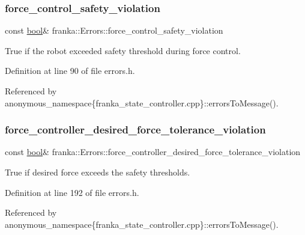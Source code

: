 \subsubsection{\texorpdfstring{force\+\_\+control\+\_\+safety\+\_\+violation}{force\_control\_safety\_violation}}
{\footnotesize\ttfamily const \hyperlink{classbool}{bool}\& franka\+::\+Errors\+::force\+\_\+control\+\_\+safety\+\_\+violation}

True if the robot exceeded safety threshold during force control. 

Definition at line 90 of file errors.\+h.



Referenced by anonymous\+\_\+namespace\{franka\+\_\+state\+\_\+controller.\+cpp\}\+::errors\+To\+Message().

\mbox{\label{structfranka_1_1Errors_ae474f20a64b2585dbe6496966dddff0a}} 
\subsubsection{\texorpdfstring{force\+\_\+controller\+\_\+desired\+\_\+force\+\_\+tolerance\+\_\+violation}{force\_controller\_desired\_force\_tolerance\_violation}}
{\footnotesize\ttfamily const \hyperlink{classbool}{bool}\& franka\+::\+Errors\+::force\+\_\+controller\+\_\+desired\+\_\+force\+\_\+tolerance\+\_\+violation}

True if desired force exceeds the safety thresholds. 

Definition at line 192 of file errors.\+h.



Referenced by anonymous\+\_\+namespace\{franka\+\_\+state\+\_\+controller.\+cpp\}\+::errors\+To\+Message().

\mbox{\label{structfranka_1_1Errors_aebb701987262097687d21b3cf1bc8930}} 
